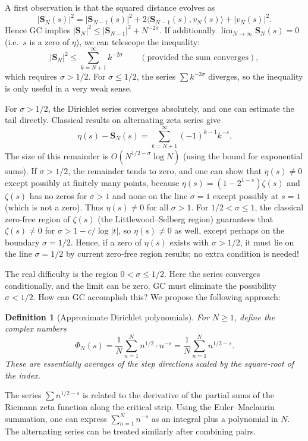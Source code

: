 \documentclass[11pt,a4paper]{article}
\newtheorem{definition}[theorem]{Definition}
\begin{document}
A first observation is that the squared distance evolves as
\[
|\mathbf{S}_N(s)|^2 = |\mathbf{S}_{N-1}(s)|^2 + 2\langle\mathbf{S}_{N-1}(s), v_N(s)\rangle + |v_N(s)|^2.
\]
Hence GC implies $|\mathbf{S}_N|^2 \le |\mathbf{S}_{N-1}|^2 + N^{-2\sigma}$.  If additionally $\lim_{N\to\infty}\mathbf{S}_N(s)=0$ (i.e.\ $s$ is a zero of $\eta$), we can telescope the inequality:
\[
|\mathbf{S}_N|^2 \le \sum_{k=N+1}^{\infty} k^{-2\sigma} \qquad (\text{provided the sum converges}),
\]
which requires $\sigma > 1/2$.  For $\sigma \le 1/2$, the series $\sum k^{-2\sigma}$ diverges, so the inequality is only useful in a very weak sense.

For $\sigma > 1/2$, the Dirichlet series converges absolutely, and one can estimate the tail directly.  Classical results on alternating zeta series give
\[
\eta(s) - \mathbf{S}_N(s) = \sum_{k=N+1}^{\infty} (-1)^{k-1} k^{-s}.
\]
The size of this remainder is $O(N^{1/2-\sigma}\log N)$ (using the bound for exponential sums).  If $\sigma > 1/2$, the remainder tends to zero, and one can show that $\eta(s) \neq 0$ except possibly at finitely many points, because $\eta(s) = (1-2^{1-s})\zeta(s)$ and $\zeta(s)$ has no zeros for $\sigma > 1$ and none on the line $\sigma = 1$ except possibly at $s = 1$ (which is not a zero).  Thus $\eta(s) \neq 0$ for all $\sigma > 1$.  For $1/2 < \sigma \le 1$, the classical zero‑free region of $\zeta(s)$ (the Littlewood–Selberg region) guarantees that $\zeta(s) \neq 0$ for $\sigma > 1 - c/\log|t|$, so $\eta(s) \neq 0$ as well, except perhaps on the boundary $\sigma = 1/2$.  Hence, if a zero of $\eta(s)$ exists with $\sigma > 1/2$, it must lie on the line $\sigma = 1/2$ by current zero‑free region results; no extra condition is needed!

The real difficulty is the region $0 < \sigma \le 1/2$.  Here the series converges conditionally, and the limit can be zero.  GC must eliminate the possibility $\sigma < 1/2$.  How can GC accomplish this?  We propose the following approach:

\begin{definition}[Approximate Dirichlet polynomials]
For $N \ge 1$, define the complex numbers
\[
\Phi_N(s) = \frac{1}{N} \sum_{n=1}^{N} n^{1/2} \cdot n^{-s} = \frac{1}{N} \sum_{n=1}^{N} n^{1/2 - s}.
\]
These are essentially averages of the step directions scaled by the square‑root of the index.
\end{definition}

The series $\sum n^{1/2 - s}$ is related to the derivative of the partial sums of the Riemann zeta function along the critical strip.  Using the Euler–Maclaurin summation, one can express $\sum_{n=1}^{N} n^{-s}$ as an integral plus a polynomial in $N$.  The alternating series can be treated similarly after combining pairs.
\end{document}
